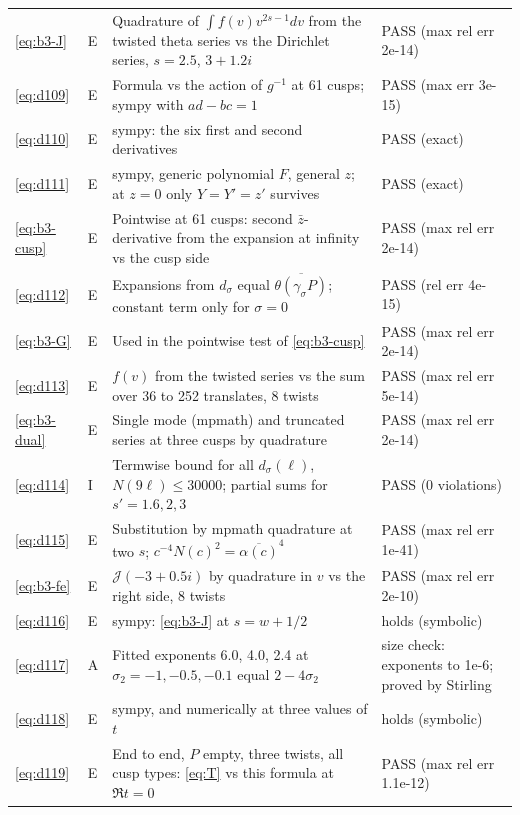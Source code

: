 \documentclass[11pt]{article}
\numberwithin{equation}{section}
\begin{document}
\begin{longtable}{@{}>{\raggedright\arraybackslash}p{1.2cm}>{\centering\arraybackslash}p{0.7cm}>{\raggedright\arraybackslash}p{9.05cm}>{\raggedright\arraybackslash}p{4.3cm}@{}}
\eqref{eq:b3-J} & E & Quadrature of $\int f(v)v^{2s-1}dv$ from the twisted theta series vs the Dirichlet series, $s=2.5$, $3+1.2i$ & PASS (max rel err 2e-14)\\
\eqref{eq:d109} & E & Formula vs the action of $g^{-1}$ at 61 cusps; sympy with $ad-bc=1$ & PASS (max err 3e-15)\\
\eqref{eq:d110} & E & sympy: the six first and second derivatives & PASS (exact)\\
\eqref{eq:d111} & E & sympy, generic polynomial $F$, general $z$; at $z=0$ only $Y=Y'=z'$ survives & PASS (exact)\\
\eqref{eq:b3-cusp} & E & Pointwise at 61 cusps: second $\bar z$-derivative from the expansion at infinity vs the cusp side & PASS (max rel err 2e-14)\\
\eqref{eq:d112} & E & Expansions from $d_\sigma$ equal $\overline{\theta(\gamma_\sigma P)}$; constant term only for $\sigma=0$ & PASS (rel err 4e-15)\\
\eqref{eq:b3-G} & E & Used in the pointwise test of \eqref{eq:b3-cusp} & PASS (max rel err 2e-14)\\
\eqref{eq:d113} & E & $f(v)$ from the twisted series vs the sum over 36 to 252 translates, 8 twists & PASS (max rel err 5e-14)\\
\eqref{eq:b3-dual} & E & Single mode (mpmath) and truncated series at three cusps by quadrature & PASS (max rel err 2e-14)\\
\eqref{eq:d114} & I & Termwise bound for all $d_\sigma(\ell)$, $N(9\ell)\le30000$; partial sums for $s'=1.6,2,3$ & PASS (0 violations)\\
\eqref{eq:d115} & E & Substitution by mpmath quadrature at two $s$; $c^{-4}N(c)^2=\overline{\alpha(c)}^4$ & PASS (max rel err 1e-41)\\
\eqref{eq:b3-fe} & E & $\mathcal J(-3+0.5i)$ by quadrature in $v$ vs the right side, 8 twists & PASS (max rel err 2e-10)\\
\eqref{eq:d116} & E & sympy: \eqref{eq:b3-J} at $s=w+1/2$ & holds (symbolic)\\
\eqref{eq:d117} & A & Fitted exponents 6.0, 4.0, 2.4 at $\sigma_2=-1,-0.5,-0.1$ equal $2-4\sigma_2$ & size check: exponents to 1e-6; proved by Stirling\\
\eqref{eq:d118} & E & sympy, and numerically at three values of $t$ & holds (symbolic)\\
\eqref{eq:d119} & E & End to end, $P$ empty, three twists, all cusp types: \eqref{eq:T} vs this formula at $\Re t=0$ & PASS (max rel err 1.1e-12)\\

\end{longtable}
\end{document}

